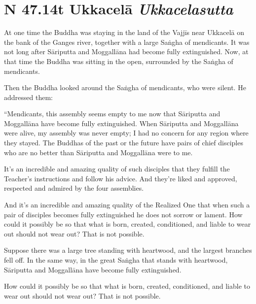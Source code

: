 \documentclass[12pt,openany]{book}%
\newcommand*{\suttatitleacronym}[1]{\smaller[2]{#1}\vspace*{.3em}}
\newcommand*{\suttatitletranslation}[1]{\linebreak{#1}}
\newcommand*{\suttatitleroot}[1]{\linebreak\smaller[2]\itshape{#1}}
\newcommand*{\tocacronym}[1]{\hspace*{-3.3em}{#1}\quad}
\newcommand*{\toctranslation}[1]{#1}
\newcommand*{\tocroot}[1]{(\textit{#1})}
\begin{document}
%
\section*{{\suttatitleacronym SN 47.14}{\suttatitletranslation At Ukkacelā }{\suttatitleroot Ukkacelasutta}}
\addcontentsline{toc}{section}{\tocacronym{SN 47.14} \toctranslation{At Ukkacelā } \tocroot{Ukkacelasutta}}

At one time the Buddha was staying in the land of the \textsanskrit{Vajjīs} near \textsanskrit{Ukkacelā} on the bank of the Ganges river, together with a large \textsanskrit{Saṅgha} of mendicants. It was not long after \textsanskrit{Sāriputta} and \textsanskrit{Moggallāna} had become fully extinguished. Now, at that time the Buddha was sitting in the open, surrounded by the \textsanskrit{Saṅgha} of mendicants. 

Then the Buddha looked around the \textsanskrit{Saṅgha} of mendicants, who were silent. He addressed them: 

“Mendicants, this assembly seems empty to me now that \textsanskrit{Sāriputta} and \textsanskrit{Moggallāna} have become fully extinguished. When \textsanskrit{Sāriputta} and \textsanskrit{Moggallāna} were alive, my assembly was never empty; I had no concern for any region where they stayed. The Buddhas of the past or the future have pairs of chief disciples who are no better than \textsanskrit{Sāriputta} and \textsanskrit{Moggallāna} were to me. 

It’s an incredible and amazing quality of such disciples that they fulfill the Teacher’s instructions and follow his advice. And they’re liked and approved, respected and admired by the four assemblies. 

And it’s an incredible and amazing quality of the Realized One that when such a pair of disciples becomes fully extinguished he does not sorrow or lament. How could it possibly be so that what is born, created, conditioned, and liable to wear out should not wear out? That is not possible. 

Suppose there was a large tree standing with heartwood, and the largest branches fell off. In the same way, in the great \textsanskrit{Saṅgha} that stands with heartwood, \textsanskrit{Sāriputta} and \textsanskrit{Moggallāna} have become fully extinguished. 

How could it possibly be so that what is born, created, conditioned, and liable to wear out should not wear out? That is not possible. 
\end{document}
